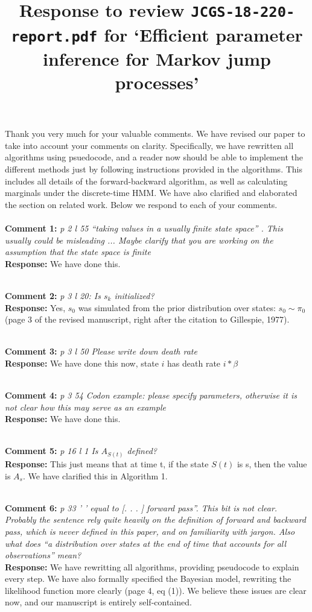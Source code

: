 \documentclass[11pt]{article}
\title{Response to review {\texttt{JCGS-18-220-report.pdf}} for `Efficient parameter inference for Markov jump processes'}
\author{}
\date{}
\newcommand{\rev}[2]{\textbf{Comment #1: }\emph{#2}}
\newcommand{\resp}{\textbf{Response: }}
\begin{document}
\maketitle

Thank you very much for your valuable comments. We have revised our paper to take into account your comments on clarity. 
Specifically, we have rewritten all algorithms using psuedocode, and a reader now should be able to implement the different methods just by following instructions provided in the algorithms. 
This includes all details of the forward-backward algorithm, as well as calculating marginals under the discrete-time HMM. 
We have also clarified and elaborated the section on related work.
Below we respond to each of your comments.
~\\ 
~\\

\noindent \rev{1}{p 2 l 55 ``taking values in a usually finite state space” . This usually could be misleading ... Maybe clarify that you are working on the assumption that the state space is finite}
\\
\resp We have done this.

~\\
\rev{2}{p 3 l 20: Is $s_k$ initialized?} \\
\resp Yes, $s_0$ was simulated from the prior distribution over states: $s_0 \sim \pi_0$ (page 3 of the revised manuscript, right after the citation to Gillespie, 1977). 

~\\
\rev{3}{p 3 l 50 Please write down death rate} \\ 
\resp  We have done this now, state $i$ has death rate $i*\beta$

~\\
\rev{4}{p 3 54 Codon example: please specify parameters, otherwise it is not clear how this may serve as an example} \\ 
\resp We have done this. 

~\\
\rev{5}{p 16 l 1 Is $A_{S(t)}$ defined?} \\
\resp{This just means that at time t, if the state $S(t)$ is s, then the value is $A_s$. We have clarified this in Algorithm 1.
}

~\\ 
\rev{6}{p 33 ’ ’ equal to [. . . ] forward pass”. This bit is not clear. Probably the sentence rely quite heavily on the definition of forward and backward pass, which is never defined in this paper, and on familiarity with jargon. Also what does “a distribution over states at
the end of time that accounts for all observations” mean?}\\ 
\resp We have rewritting all algorithms, providing pseudocode to explain every step. We have also formally specified the Bayesian model, rewriting the likelihood function more clearly (page 4, eq (1)). We believe these issues are clear now, and our manuscript is entirely self-contained.
\end{document}
